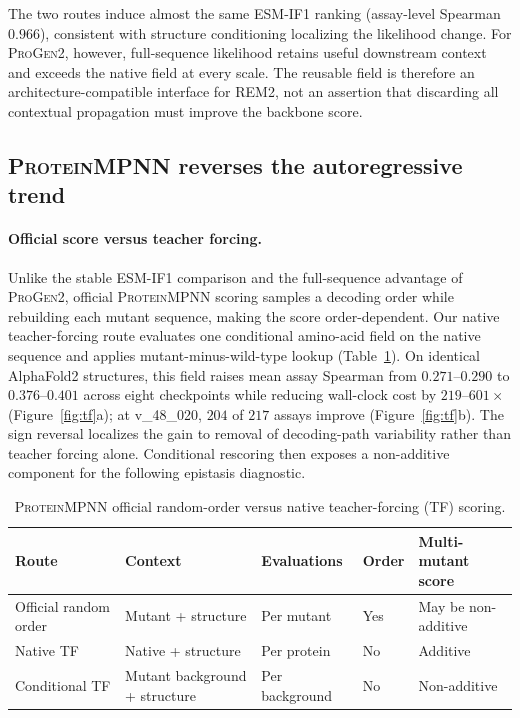 \documentclass{article} %
\begin{document}
The two routes induce almost the same \textsc{ESM-IF1} ranking (assay-level Spearman $0.966$), consistent with structure conditioning localizing the likelihood change. For \textsc{ProGen2}, however, full-sequence likelihood retains useful downstream context and exceeds the native field at every scale. The reusable field is therefore an architecture-compatible interface for \textsc{REM2}, not an assertion that discarding all contextual propagation must improve the backbone score.

\FloatBarrier
\subsection{\textsc{ProteinMPNN} reverses the autoregressive trend}

\paragraph{Official score versus teacher forcing.}
Unlike the stable \textsc{ESM-IF1} comparison and the full-sequence advantage of \textsc{ProGen2}, official \textsc{ProteinMPNN} scoring samples a decoding order while rebuilding each mutant sequence, making the score order-dependent. Our native teacher-forcing route evaluates one conditional amino-acid field on the native sequence and applies mutant-minus-wild-type lookup (Table~\ref{tab:pmpnn_interfaces}). On identical AlphaFold2 structures, this field raises mean assay Spearman from $0.271$--$0.290$ to $0.376$--$0.401$ across eight checkpoints while reducing wall-clock cost by $219$--$601\times$ (Figure~\ref{fig:tf}a); at v\_48\_020, $204$ of $217$ assays improve (Figure~\ref{fig:tf}b). The sign reversal localizes the gain to removal of decoding-path variability rather than teacher forcing alone. Conditional rescoring then exposes a non-additive component for the following epistasis diagnostic.

\begin{table}[!ht]
\caption{\textsc{ProteinMPNN} official random-order versus native teacher-forcing (TF) scoring.}
\label{tab:pmpnn_interfaces}
\centering
\footnotesize
\setlength{\tabcolsep}{2.5pt}
\begin{tabular}{@{}lllll@{}}
\toprule
Route & Context & Evaluations & Order & Multi-mutant score \\
\midrule
Official random order & Mutant + structure & Per mutant & Yes & May be non-additive \\
Native TF & Native + structure & Per protein & No & Additive \\
Conditional TF & Mutant background + structure & Per background & No & Non-additive \\
\bottomrule
\end{tabular}
\end{table}
\end{document}
